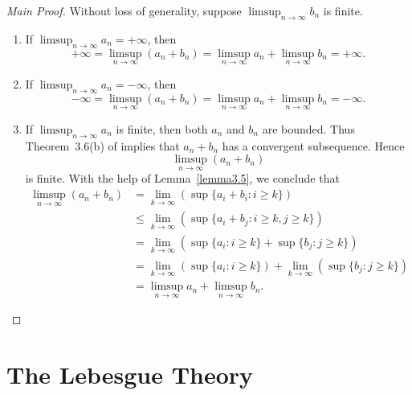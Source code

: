 \documentclass{amsbook}
\theoremstyle{definition}
\theoremstyle{remark}
\numberwithin{section}{chapter}
\numberwithin{equation}{chapter}
\begin{document}
\begin{proof}[Main Proof]
Without loss of generality, suppose $\limsup_{n\to\infty}b_n$ is finite.

\begin{enumerate}
\item If $\limsup_{n\to\infty}a_n=+\infty$, then\[
+\infty=\limsup_{n\to\infty}(a_n+b_n)=\limsup_{n\to\infty}a_n+\limsup_{n\to\infty}b_n=+\infty.
\]
\item If $\limsup_{n\to\infty}a_n=-\infty$, then\[
-\infty=\limsup_{n\to\infty}(a_n+b_n)=\limsup_{n\to\infty}a_n+\limsup_{n\to\infty}b_n=-\infty.
\]
\item If $\limsup_{n\to\infty}a_n$ is finite, then both $a_n$ and $b_n$ are bounded. Thus Theorem~3.6(b) of \cite{rudin1976principles} implies that $a_n+b_n$ has a convergent subsequence. Hence\[
\limsup_{n\to\infty}(a_n+b_n)
\]is finite. With the help of Lemma~\ref{lemma3.5}, we conclude that\[
\begin{split}
\limsup_{n\to\infty}(a_n+b_n)&=\lim_{k\to\infty}\left(\sup\{a_i+b_i:i\geqslant k\}\right)\\
&\leqslant\lim_{k\to\infty}\left(\sup\{a_i+b_j:i\geqslant k,j\geqslant k\}\right)\\
&=\lim_{k\to\infty}\left(\sup\{a_i:i\geqslant k\}+\sup\{b_j:j\geqslant k\}\right)\\
&=\lim_{k\to\infty}\left(\sup\{a_i:i\geqslant k\}\right) + \lim_{k\to\infty}\left(\sup\{b_j:j\geqslant k\}\right)\\
&=\limsup_{n\to\infty}a_n+\limsup_{n\to\infty}b_n.
\end{split}
\]
\end{enumerate}
\end{proof}

\setcounter{chapter}{10}
\chapter{The Lebesgue Theory}
\end{document}
